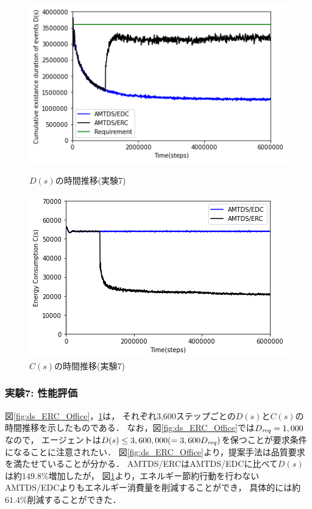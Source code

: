 \documentclass[12pt,a4j,twoside]{jarticle}
\def\Dreq{{D_{\it req}}}
\begin{document}
  \begin{figure}
    \centering
    \includegraphics[width=0.9\hsize]{figures/ds_graph_3600_ave_ERC_Office_600.png}
    \caption{$D(s)$の時間推移(実験7)}
    \label{fig:ds_ERC_Office}
    \vspace{40pt}
    \centering
    \includegraphics[width=0.9\hsize]{figures/cs_graph_3600_ave_ERC_Office_600.png}
    \caption{$C(s)$の時間推移(実験7)}
    \label{fig:cs_ERC_Office}
  \end{figure}

  
  \subsubsection{実験7: 性能評価}\label{ex:ERC1}
  図\ref{fig:ds_ERC_Office}，\ref{fig:cs_ERC_Office}は，
  それぞれ3,600ステップごとの$D(s)$と$C(s)$の時間推移を示したものである．
  なお，図\ref{fig:ds_ERC_Office}では$\Dreq=1,000$なので，
  エージェントは$D(s) \leq 3,600,000 (=3,600\Dreq)$を保つことが要求条件になることに注意されたい．
  図\ref{fig:ds_ERC_Office}より，提案手法は品質要求を満たせていることが分かる．
  AMTDS/ERCはAMTDS/EDCに比べて$D(s)$は約$149.8\%$増加したが，
  図\ref{fig:cs_ERC_Office}より，エネルギー節約行動を行わないAMTDS/EDCよりもエネルギー消費量を削減することができ，
  具体的には約$61.4\%$削減することができた．
  
\end{document}
